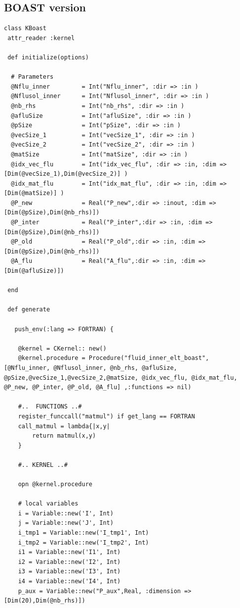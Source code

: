 \documentclass[10pt,twoside]{article}   	%
\begin{document}
\subsection{BOAST version}

\lstset{language=RUBY}
\begin{lstlisting}[caption=KBoast.rb]
class KBoast
 attr_reader :kernel

 def initialize(options)

  # Parameters 
  @Nflu_inner         = Int("Nflu_inner", :dir => :in )
  @Nflusol_inner      = Int("Nflusol_inner", :dir => :in )
  @nb_rhs             = Int("nb_rhs", :dir => :in )
  @afluSize           = Int("afluSize", :dir => :in )
  @pSize              = Int("pSize", :dir => :in )
  @vecSize_1          = Int("vecSize_1", :dir => :in )
  @vecSize_2          = Int("vecSize_2", :dir => :in )
  @matSize            = Int("matSize", :dir => :in )
  @idx_vec_flu        = Int("idx_vec_flu", :dir => :in, :dim => [Dim(@vecSize_1),Dim(@vecSize_2)] )
  @idx_mat_flu        = Int("idx_mat_flu", :dir => :in, :dim => [Dim(@matSize)] )
  @P_new              = Real("P_new",:dir => :inout, :dim => [Dim(@pSize),Dim(@nb_rhs)])
  @P_inter            = Real("P_inter",:dir => :in, :dim => [Dim(@pSize),Dim(@nb_rhs)])
  @P_old              = Real("P_old",:dir => :in, :dim => [Dim(@pSize),Dim(@nb_rhs)])
  @A_flu              = Real("A_flu",:dir => :in, :dim => [Dim(@afluSize)])

 end

 def generate

   push_env(:lang => FORTRAN) {

    @kernel = CKernel:: new()
    @kernel.procedure = Procedure("fluid_inner_elt_boast",[@Nflu_inner, @Nflusol_inner, @nb_rhs, @afluSize, @pSize,@vecSize_1,@vecSize_2,@matSize, @idx_vec_flu, @idx_mat_flu, @P_new, @P_inter, @P_old, @A_flu] ,:functions => nil)

    #..  FUNCTIONS ..#
    register_funccall("matmul") if get_lang == FORTRAN
    call_matmul = lambda{|x,y|
        return matmul(x,y)
    }

    #.. KERNEL ..#

    opn @kernel.procedure

    # local variables
    i = Variable::new('I', Int)
    j = Variable::new('J', Int)
    i_tmp1 = Variable::new('I_tmp1', Int)
    i_tmp2 = Variable::new('I_tmp2', Int)
    i1 = Variable::new('I1', Int)
    i2 = Variable::new('I2', Int)
    i3 = Variable::new('I3', Int)
    i4 = Variable::new('I4', Int)
    p_aux = Variable::new("P_aux",Real, :dimension => [Dim(20),Dim(@nb_rhs)])


\end{lstlisting}
\end{document}

